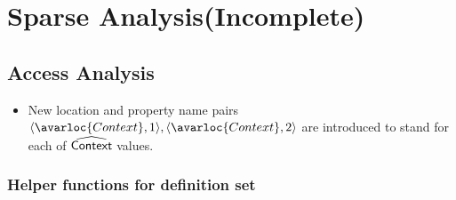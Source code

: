 \chapter{Sparse Analysis(Incomplete)}
\section{Access Analysis}
\begin{itemize}
  \item New location and property name pairs $\langle\avarloc{Context},1\rangle, \langle\avarloc{Context},2\rangle$ are introduced to stand for each of $\widehat{\mbox{\textsf{Context}}}$ values.

\end{itemize}
\subsection{Helper functions for definition set}
